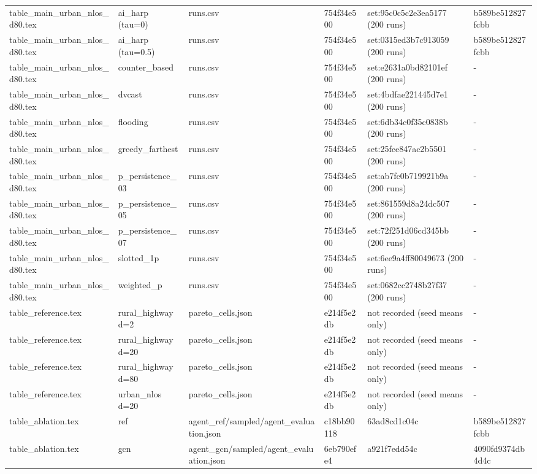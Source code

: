 \begin{tabular}{llllll}
table\_main\_urban\_nlos\_d80.tex & ai\_harp (tau=0) & runs.csv & 754f34e500 & set:95c0c5c2e3ea5177 (200 runs) & b589be512827fcbb \\
table\_main\_urban\_nlos\_d80.tex & ai\_harp (tau=0.5) & runs.csv & 754f34e500 & set:0315ed3b7c913059 (200 runs) & b589be512827fcbb \\
table\_main\_urban\_nlos\_d80.tex & counter\_based & runs.csv & 754f34e500 & set:e2631a0bd82101ef (200 runs) & - \\
table\_main\_urban\_nlos\_d80.tex & dvcast & runs.csv & 754f34e500 & set:4bdfae221445d7e1 (200 runs) & - \\
table\_main\_urban\_nlos\_d80.tex & flooding & runs.csv & 754f34e500 & set:6db34c0f35c0838b (200 runs) & - \\
table\_main\_urban\_nlos\_d80.tex & greedy\_farthest & runs.csv & 754f34e500 & set:25fce847ac2b5501 (200 runs) & - \\
table\_main\_urban\_nlos\_d80.tex & p\_persistence\_03 & runs.csv & 754f34e500 & set:ab7fc0b719921b9a (200 runs) & - \\
table\_main\_urban\_nlos\_d80.tex & p\_persistence\_05 & runs.csv & 754f34e500 & set:861559d8a24dc507 (200 runs) & - \\
table\_main\_urban\_nlos\_d80.tex & p\_persistence\_07 & runs.csv & 754f34e500 & set:72f251d06cd345bb (200 runs) & - \\
table\_main\_urban\_nlos\_d80.tex & slotted\_1p & runs.csv & 754f34e500 & set:6ee9a4ff80049673 (200 runs) & - \\
table\_main\_urban\_nlos\_d80.tex & weighted\_p & runs.csv & 754f34e500 & set:0682cc2748b27f37 (200 runs) & - \\
table\_reference.tex & rural\_highway d=2 & pareto\_cells.json & e214f5e2db & not recorded (seed means only) & - \\
table\_reference.tex & rural\_highway d=20 & pareto\_cells.json & e214f5e2db & not recorded (seed means only) & - \\
table\_reference.tex & rural\_highway d=80 & pareto\_cells.json & e214f5e2db & not recorded (seed means only) & - \\
table\_reference.tex & urban\_nlos d=20 & pareto\_cells.json & e214f5e2db & not recorded (seed means only) & - \\
table\_ablation.tex & ref & agent\_ref/sampled/agent\_evaluation.json & c18bb90118 & 63ad8cd1c04c & b589be512827fcbb \\
table\_ablation.tex & gcn & agent\_gcn/sampled/agent\_evaluation.json & 6eb790efe4 & a921f7edd54c & 4090fd9374db4d4c \\

\end{tabular}
